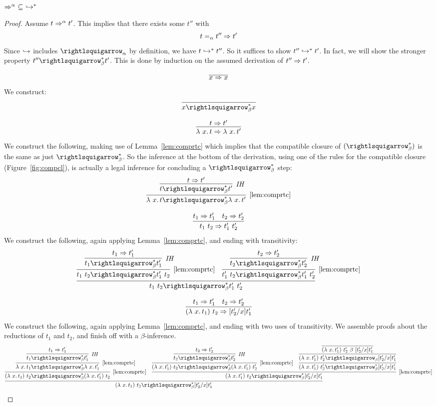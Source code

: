 \begin{lemma}
  \label{lem:predmbeta}
  $\Rightarrow^\alpha\ \subseteq\ \hookrightarrow^*$
\end{lemma}
\begin{proof}
  Assume $t \Rightarrow^\alpha t'$.  This implies that there exists some $t''$ with
  \[
  t =_\alpha t'' \Rightarrow t'
  \]
  \noindent Since $\hookrightarrow$ includes $\curva_\alpha$ by definition, we have
  $t \hookrightarrow^* t''$.  So it suffices to show $t'' \hookrightarrow^* t'$.  In fact,
  we will show the stronger property $t'' \curva_\beta^* t'$.  This
  is done by  induction on the assumed
  derivation of $t'' \Rightarrow t'$.

  \case{ }
  \[
  \predvar
  \]
  \noindent We construct:
  \[
  \infer{x \betaa_\beta^* x}{\ }
  \]

  \case{ }
  \[
  \predlam
  \]
  \noindent We construct the following, making use of
  Lemma~\ref{lem:comprtc} which implies that the compatible closure of $(\betaa_\beta^*)$
  is the same as just $\betaa_\beta^*$. So the inference at the bottom of the
  derivation, using one of the rules for the compatible closure
  (Figure~\ref{fig:compcl}), is actually a legal inference for
  concluding a $\betaa_\beta^*$ step:
  \[
  \infer[\ref{lem:comprtc}]{\lam{x}{t} \betaa_\beta^* \lam{x}{t'}}
    {\infer[\textit{IH}]{t \betaa_\beta^* t'}{t \Pred t'}}
    \]

    \case{ }
    \[
    \predapp
    \]
    \noindent We construct the following, again applying Lemma~\ref{lem:comprtc}, and ending with transitivity:
    \[
    \infer{t_1\ t_2 \betaa_\beta^* t_1'\ t_2'}
          {\infer[\ref{lem:comprtc}]{t_1\ t_2 \betaa_\beta^* t_1'\ t_2}{\infer[\textit{IH}]{t_1 \betaa_\beta^* t_1'}{t_1 \Pred t_1'}} &
           \infer[\ref{lem:comprtc}]{t_1'\ t_2 \betaa_\beta^* t_1'\ t_2'}{\infer[\textit{IH}]{t_2 \betaa_\beta^* t_2'}{t_2 \Pred t_2'}}}
          \]

    \case{ }
    \[
    \predbeta
    \]
    \noindent We construct the following, again applying Lemma~\ref{lem:comprtc}, and ending with two uses of transitivity.  We assemble proofs about the reductions of $t_1$ and $t_2$, and finish off with a $\beta$-inference.
    \[
    \infer{(\lam{x}{t_1})\ t_2 \betaa_\beta^* [t_2'/x]t_1'}
          {\infer[\ref{lem:comprtc}]{(\lam{x}{t_1})\ t_2 \betaa_\beta^* (\lam{x}{t_1'})\ t_2}
                {\infer[\ref{lem:comprtc}]{\lam{x}{t_1} \betaa_\beta^* \lam{x}{t_1'}}{\infer[\textit{IH}]{t_1 \betaa_\beta^* t_1'}{t_1 \Pred t_1'}}} &
                \infer[\ref{lem:comprtc}]{(\lam{x}{t_1'})\ t_2 \betaa_\beta^* [t_2'/x]t_1'}
                      {\infer[\ref{lem:comprtc}]{(\lam{x}{t_1'})\ t_2 \betaa_\beta^* (\lam{x}{t_1'})\ t_2'}
                        {\infer[\textit{IH}]{t_2 \betaa_\beta^* t_2'}{t_2 \Pred t_2'}}
                     & \infer{(\lam{x}{t_1'})\ t_2' \betaa_\beta^* [t_2'/x]t_1'}{\infer{(\lam{x}{t_1'})\ t_2' \betaa_\beta [t_2'/x]t_1'}{\infer{(\lam{x}{t_1'})\ t_2' \ \beta\  [t_2'/x]t_1'}{\ }}}}}
          \]

          
\end{proof}


